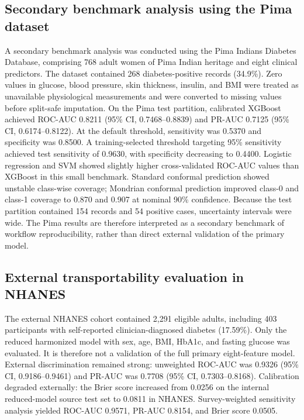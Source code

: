 \documentclass{ieeeaccess}
\begin{document}
\subsection{Secondary benchmark analysis using the Pima dataset}
A secondary benchmark analysis was conducted using the Pima Indians Diabetes Database, comprising 768 adult women of Pima Indian heritage and eight clinical predictors. The dataset contained 268 diabetes-positive records (34.9\%). Zero values in glucose, blood pressure, skin thickness, insulin, and BMI were treated as unavailable physiological measurements and were converted to missing values before split-safe imputation. On the Pima test partition, calibrated XGBoost achieved ROC-AUC 0.8211 (95\% CI, 0.7468--0.8839) and PR-AUC 0.7125 (95\% CI, 0.6174--0.8122). At the default threshold, sensitivity was 0.5370 and specificity was 0.8500. A training-selected threshold targeting 95\% sensitivity achieved test sensitivity of 0.9630, with specificity decreasing to 0.4400. Logistic regression and SVM showed slightly higher cross-validated ROC-AUC values than XGBoost in this small benchmark. Standard conformal prediction showed unstable class-wise coverage; Mondrian conformal prediction improved class-0 and class-1 coverage to 0.870 and 0.907 at nominal 90\% confidence. Because the test partition contained 154 records and 54 positive cases, uncertainty intervals were wide. The Pima results are therefore interpreted as a secondary benchmark of workflow reproducibility, rather than direct external validation of the primary model.

\subsection{External transportability evaluation in NHANES}
The external NHANES cohort contained 2,291 eligible adults, including 403 participants with self-reported clinician-diagnosed diabetes (17.59\%). Only the reduced harmonized model with sex, age, BMI, HbA1c, and fasting glucose was evaluated. It is therefore not a validation of the full primary eight-feature model. External discrimination remained strong: unweighted ROC-AUC was 0.9326 (95\% CI, 0.9186--0.9461) and PR-AUC was 0.7708 (95\% CI, 0.7303--0.8168). Calibration degraded externally: the Brier score increased from 0.0256 on the internal reduced-model source test set to 0.0811 in NHANES. Survey-weighted sensitivity analysis yielded ROC-AUC 0.9571, PR-AUC 0.8154, and Brier score 0.0505.
\end{document}
